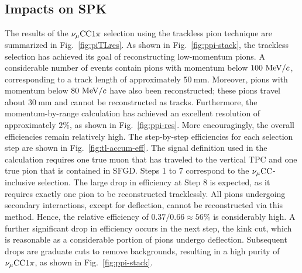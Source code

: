      \subsection{Impacts on SPK}
          The results of the $\nu_{\mu}\textrm{CC}1\pi$ selection using the trackless pion technique are summarized in Fig.~\ref{fig:piTLres}.
          As shown in Fig.~\ref{fig:ppi-stack}, the trackless selection has achieved its goal of reconstructing low-momentum pions.
          A considerable number of events contain pions with momentum below $100~\textrm{MeV}/c$, corresponding to a track length of approximately $50~\textrm{mm}$.
          Moreover, pions with momentum below $80~\textrm{MeV}/c$ have also been reconstructed; these pions travel about $30~\textrm{mm}$ and cannot be reconstructed as tracks.
          Furthermore, the momentum-by-range calculation has achieved an excellent resolution of approximately $2\%$, as shown in Fig.~\ref{fig:ppi-res}.
          More encouragingly, the overall efficiencies remain relatively high.
          The step-by-step efficiencies for each selection step are shown in Fig.~\ref{fig:tl-accum-eff}.
          The signal definition used in the calculation requires one true muon that has traveled to the vertical TPC and one true pion that is contained in SFGD.
          Steps 1 to 7 correspond to the $\nu_{\mu}\textrm{CC}$-inclusive selection.
          The large drop in efficiency at Step 8 is expected, as it requires exactly one pion to be reconstructed tracklessly.
          All pions undergoing secondary interactions, except for deflection, cannot be reconstructed via this method.
          Hence, the relative efficiency of $0.37/0.66\approx56\%$ is considerably high.
          A further significant drop in efficiency occurs in the next step, the kink cut, which is reasonable as a considerable portion of pions undergo deflection.
          Subsequent drops are graduate cuts to remove backgrounds, resulting in a high purity of $\nu_{\mu}\textrm{CC}1\pi$, as shown in Fig.~\ref{fig:ppi-stack}.

